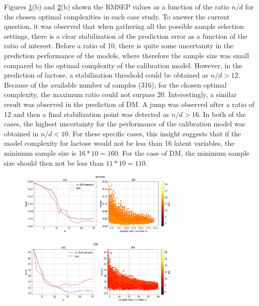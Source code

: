 \documentclass[journal=ancham,manuscript=article]{achemso}
\begin{document}
Figures \ref{fig_d01_milk_general_framework}(b) and \ref{fig_d02_manure_general_framework}(b) shown the RMSEP values as a function of the ratio $n/d$ for the chosen optimal complexities in each case study. To answer the current question, it was observed that when gathering all the possible sample selection settings, there is a clear stabilization of the prediction error as a function of the ratio of interest. Before a ratio of 10, there is quite some uncertainty in the prediction performance of the models, where therefore the sample size was small compared to the optimal complexity of the calibration model. However, in the prediction of lactose, a stabilization threshold could be obtained as $n/d>12$. Because of the available number of samples (316), for the chosen optimal complexity, the maximum ratio could not surpass 20. Interestingly, a similar result was observed in the prediction of DM. A jump was observed after a ratio of 12 and then a final stabilization point was detected as $n/d>16$. In both of the cases, the highest uncertainty for the performance of the calibration model was obtained in $n/d<10$. For these specific cases, this insight suggests that if the model complexity for lactose would not be less than 16 latent variables, the minimum sample size is $16*10=160$. For the case of DM, the minimum sample size should then not be less than $11*10=110$. 

\begin{figure}[b]
\includegraphics[width=0.7\textwidth]{manuscript/figures/d01_milk_general_framework.png}
\centering
\caption{}
\label{fig_d01_milk_general_framework}
\end{figure}

\begin{figure}[b]
\includegraphics[width=0.7\textwidth]{manuscript/figures/d02_manure_general_framework.png}
\centering
\caption{}
\label{fig_d02_manure_general_framework}
\end{figure}
\end{document}
